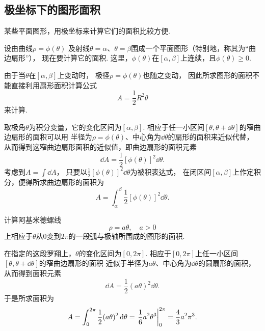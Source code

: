 \subsection{极坐标下的图形面积}
某些平面图形，用极坐标来计算它们的面积比较方便.

设由曲线\(\rho = \phi(\theta)\)
及射线\(\theta=\alpha\)、\(\theta=\beta\)围成一个平面图形（特别地，称其为“曲边扇形”），
现在要计算它的面积.
这里，\(\phi(\theta)\)在\([\alpha,\beta]\)上连续，且\(\phi(\theta)\geq0\).

由于当\(\theta\)在\([\alpha,\beta]\)上变动时，
极径\(\rho=\phi(\theta)\)也随之变动，
因此所求图形的面积不能直接利用扇形面积计算公式\[
    A = \frac{1}{2} R^2 \theta
\]来计算.

取极角\(\theta\)为积分变量，它的变化区间为\([\alpha,\beta]\).
相应于任一小区间\([\theta,\theta+\dd{\theta}]\)的窄曲边扇形的面积可以用
半径为\(\rho=\phi(\theta)\)、中心角为\(\dd{\theta}\)的扇形的面积来近似代替，
从而得到这窄曲边扇形面积的近似值，即曲边扇形的面积元素\begin{equation}
    \dd{A}
    = \frac{1}{2} [\phi(\theta)]^2 \dd{\theta}.
\end{equation}
考虑到\(A = \int \dd{A}\)，
只要以\(\frac{1}{2} [\phi(\theta)]^2 \dd{\theta}\)为被积表达式，
在闭区间\([\alpha,\beta]\)上作定积分，便得所求曲边扇形的面积为\begin{equation}
	A = \int_\alpha^\beta \frac{1}{2} [\phi(\theta)]^2 \dd{\theta}.
\end{equation}

\begin{example}
计算阿基米德螺线\[
	\rho = a \theta, \quad a>0
\]上相应于\(\theta\)从\(0\)变到\(2\pi\)的一段弧与极轴所围成的图形的面积.
\begin{solution}
在指定的这段罗翔上，\(\theta\)的变化区间为\([0,2\pi]\).
相应于\([0,2\pi]\)上任一小区间\([\theta,\theta+\dd{\theta}]\)的窄曲边扇形的面积
近似于半径为\(a \theta\)、中心角为\(\dd{\theta}\)的圆扇形的面积，
从而得到面积元素\[
	\dd{A} = \frac12 (a \theta)^2 \dd{\theta}.
\]
于是所求面积为\[
	A = \int_0^{2\pi} \frac12 (a \theta)^2 \dd{\theta}
	= \eval{\frac16 a^2 \theta^3}_0^{2\pi}
	= \frac43 a^2 \pi^3.
\]
\end{solution}
\end{example}

